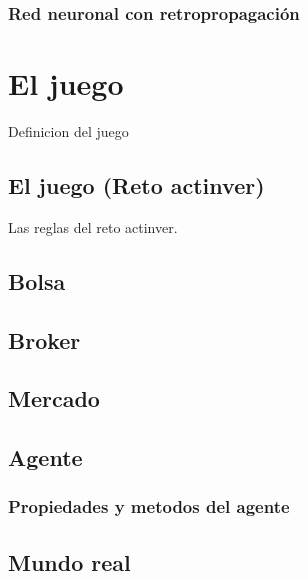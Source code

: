         \subsection{Red neuronal con retropropagación}
    

\chapter{El juego}

    Definicion del juego
    
    \section{El juego (Reto actinver)}
        
        Las reglas del reto actinver.
    
    \section{Bolsa} %
      
        \blindtext
        
   	\section{Broker} %
     
    \section{Mercado} 
    
        \blindtext
    
    \section{Agente} %
        
        \subsection{Propiedades y metodos del agente}

                \blindtext
   
   	
   	\section{Mundo real} %
   	

